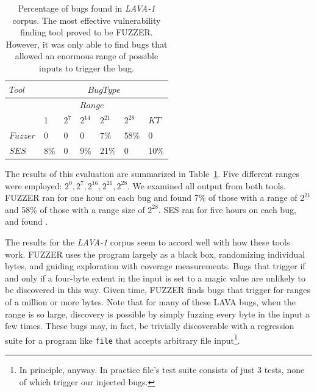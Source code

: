 \begin{table}[h]
\centering
\begin{tabular}{l|l|l|l|l|l|l} 
$Tool$   &                     \multicolumn{6}{|c}{$Bug Type$}                           \\  \hline  
         &                     \multicolumn{5}{|c|}{$Range$}                   &     \\   
         &    1       & $2^7$       & $2^{14}$     & $2^{21}$   & $2^{28}$     & $KT$   \\  \hline 
$Fuzzer$ &    0       & 0           & 0            & 7\%        & 58\%         & 0         \\
$SES$    &    8\%     & 0           & 9\%          & 21\%       & 0            & 10\%         \\
\end{tabular}
\caption{Percentage of bugs found in \emph{LAVA-1} corpus. %
The most effective vulnerability finding tool proved to be FUZZER.  
However, it was only able to find bugs that allowed an enormous range of possible inputs to trigger the bug.}
\label{table:eval1-file}
\end{table}

The results of this evaluation are summarized in Table~\ref{table:eval1-file}.
Five different ranges were employed: $2^0, 2^7, 2^{16}, 2^{21}, 2^{28}$. 
We examined all output from both tools.  
FUZZER ran for one hour on each bug and found 7\% of those with a range of $2^{21}$ and 58\% of those with a range size of $2^{28}$.
SES ran for five hours on each bug, and found .

The results for the \emph{LAVA-1} corpus seem to accord well with how these tools work.
FUZZER uses the program largely as a black box, randomizing individual bytes, and guiding exploration with coverage measurements.
Bugs that trigger if and only if a four-byte extent in the input is set to a magic value are unlikely to be discovered in this way.
Given time, FUZZER finds bugs that trigger for ranges of a million or more bytes. 
Note that for many of these LAVA bugs, when the range is so large, discovery is possible by simply fuzzing every byte in the input a few times.  
These bugs may, in fact, be trivially discoverable with a regression suite for a program like \verb+file+ that accepts arbitrary file input\footnote{In principle, anyway. In practice file's test suite consists of just 3 tests, none of which trigger our injected bugs.}.

